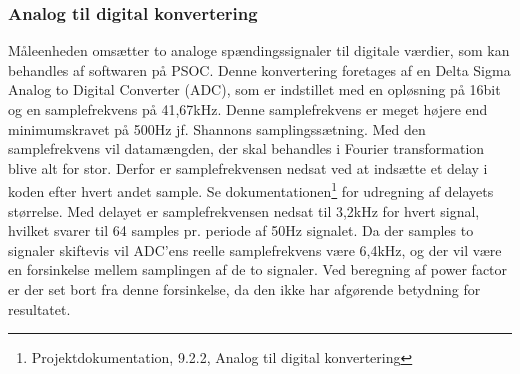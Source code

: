 
\subsubsection{Analog til digital konvertering}
Måleenheden omsætter to analoge spændingssignaler til digitale værdier, som kan behandles af softwaren på PSOC. Denne konvertering foretages af en Delta Sigma Analog to Digital Converter (ADC), som er indstillet med en opløsning på 16bit og en samplefrekvens på 41,67kHz. Denne samplefrekvens er meget højere end minimumskravet på 500Hz jf. Shannons samplingssætning. Med den samplefrekvens vil datamængden, der skal behandles i Fourier transformation blive alt for stor. Derfor er samplefrekvensen nedsat ved at indsætte et delay i koden efter hvert andet sample. Se dokumentationen\footnote{Projektdokumentation, 9.2.2, Analog til digital konvertering} for udregning af delayets størrelse. Med delayet er samplefrekvensen nedsat til 3,2kHz for hvert signal, hvilket svarer til 64 samples pr. periode af 50Hz signalet. Da der samples to signaler skiftevis vil ADC'ens reelle samplefrekvens være 6,4kHz, og der vil være en forsinkelse mellem samplingen af de to signaler. Ved beregning af power factor er der set bort fra denne forsinkelse, da den ikke har afgørende betydning for resultatet.  
